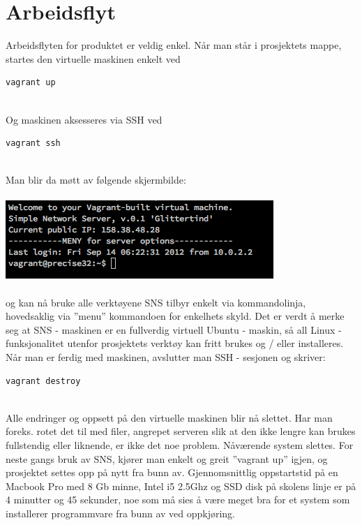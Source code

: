 \documentclass{article}
\begin{document}
\section{Arbeidsflyt}
Arbeidsflyten for produktet er veldig enkel. Når man står i prosjektets mappe, startes den virtuelle maskinen enkelt ved \\
\begin{lstlisting}
vagrant up
\end{lstlisting}
\\ 
Og maskinen aksesseres via SSH ved
\begin{lstlisting}
vagrant ssh
\end{lstlisting}
\\
Man blir da møtt av følgende skjermbilde: \\ \\
\includegraphics[scale = 0.7]{pictures/vagrantSSH.png}
\\ \\
og kan nå bruke alle verktøyene SNS tilbyr enkelt via kommandolinja, hovedsaklig via ''menu'' kommandoen for enkelhets skyld. Det er verdt å merke seg at SNS - maskinen er en fullverdig virtuell Ubuntu - maskin, så all Linux - funksjonalitet utenfor prosjektets verktøy kan fritt brukes og / eller installeres. \\ 
Når man er ferdig med maskinen, avslutter man SSH - sesjonen og skriver: \\
\begin{lstlisting}
vagrant destroy
\end{lstlisting}
\\
Alle endringer og oppsett på den virtuelle maskinen blir nå slettet. Har man foreks. rotet det til med filer, angrepet serveren slik at den ikke lengre kan brukes fullstendig eller liknende, er ikke det noe problem. Nåværende system slettes. For neste gangs bruk av SNS, kjører man enkelt og greit ''vagrant up'' igjen, og prosjektet settes opp på nytt fra bunn av. Gjennomsnittlig oppstartstid på en Macbook Pro med 8 Gb minne, Intel i5 2.5Ghz og SSD disk på skolens linje er på 4 minutter og 45 sekunder, noe som må sies å være meget bra for et system som installerer programmvare fra bunn av ved oppkjøring.
\end{document}
